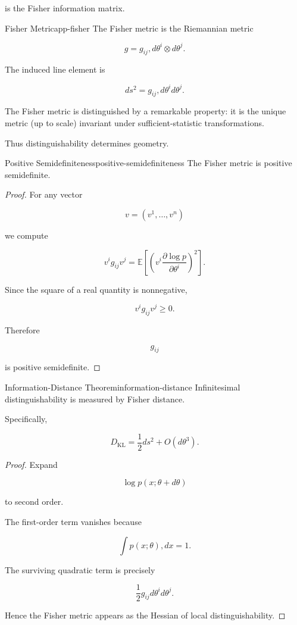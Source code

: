 \documentclass[12pt,twoside,openright]{book}
\begin{document}
is the Fisher information matrix.

\begin{definition}{Fisher Metric}{app-fisher}
The Fisher metric is the Riemannian metric

\[
g
=

g_{ij}
,d\theta^i\otimes d\theta^j.
\]

The induced line element is

\[
ds^2
=

g_{ij}
,d\theta^i d\theta^j.
\]
\end{definition}

The Fisher metric is distinguished by a remarkable property:
it is the unique metric (up to scale) invariant under
sufficient-statistic transformations.

Thus distinguishability determines geometry.

\begin{proposition}{Positive Semidefiniteness}{positive-semidefiniteness}
The Fisher metric is positive semidefinite.
\end{proposition}

\begin{proof}
For any vector

\[
v=(v^1,\ldots,v^n)
\]

we compute

\[
v^i g_{ij} v^j
=

\mathbb E
\left[
\left(
v^i
\frac{\partial\log p}{\partial\theta^i}
\right)^2
\right].
\]

Since the square of a real quantity is nonnegative,

\[
v^i g_{ij}v^j \ge 0.
\]

Therefore

\[
g_{ij}
\]

is positive semidefinite.
\end{proof}

\begin{theorem}{Information-Distance Theorem}{information-distance}
Infinitesimal distinguishability is measured by Fisher
distance.

Specifically,

\[
D_{\mathrm{KL}}
=

\frac12 ds^2
+
O(d\theta^3).
\]
\end{theorem}

\begin{proof}
Expand

\[
\log p(x;\theta+d\theta)
\]

to second order.

The first-order term vanishes because

\[
\int p(x;\theta),dx =1.
\]

The surviving quadratic term is precisely

\[
\frac12 g_{ij}
d\theta^i d\theta^j.
\]

Hence the Fisher metric appears as the Hessian of local
distinguishability.
\end{proof}
\end{document}
